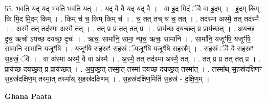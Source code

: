 \documentclass[17pt]{extarticle}
\begin{document}
55. भ॒व॒ति॒ यद् यद् भ॑वति भवति॒ यत् । . यद् वै वै यद् यद् वै । . वा इ॒द मि॒दं ॅवै वा इ॒दम् । . इ॒दम् किम् कि मि॒द मि॒दम् किम् । . किम् च॑ च॒ किम् किम् च॑ । . च॒ तत् तच् च॑ च॒ तत् । . तद॑स्मा अस्मै॒ तत् तद॑स्मै । . अ॒स्मै॒ तत् तद॑स्मा अस्मै॒ तत् । . तत् प्र प्र तत् तत् प्र । . प्राय॑च्छ दयच्छ॒त् प्र प्राय॑च्छत् । . अ॒य॒च्छ॒ दृच॒ ऋचो॑ ऽयच्छ दयच्छ॒ दृचः॑ । . ऋचः॒ सामा॑नि॒ सामा॒ न्यृच॒ ऋचः॒ सामा॑नि । . सामा॑नि॒ यजूꣳ॑षि॒ यजूꣳ॑षि॒ सामा॑नि॒ सामा॑नि॒ यजूꣳ॑षि । . यजूꣳ॑षि स॒हस्रꣳ॑ स॒हस्रं॒ ॅयजूꣳ॑षि॒ यजूꣳ॑षि स॒हस्र᳚म् । . स॒हस्रं॒ ॅवै वै स॒हस्रꣳ॑ स॒हस्रं॒ ॅवै । . वा अ॑स्मा अस्मै॒ वै वा अ॑स्मै । . अ॒स्मै॒ तत् तद॑स्मा अस्मै॒ तत् । . तत् प्र प्र तत् तत् प्र । . प्राय॑च्छ दयच्छ॒त् प्र प्राय॑च्छत् । . अ॒य॒च्छ॒त् तस्मा॒त् तस्मा॑ दयच्छ दयच्छ॒त् तस्मा᳚त् । . तस्मा᳚थ् स॒हस्र॑दक्षिणꣳ स॒हस्र॑दक्षिण॒म् तस्मा॒त् तस्मा᳚थ् स॒हस्र॑दक्षिणम् । . स॒हस्र॑दक्षिण॒मिति॑ स॒हस्र॑ - द॒क्षि॒ण॒म् । \newline

\textbf{Ghana Paata } \newline
\end{document}
